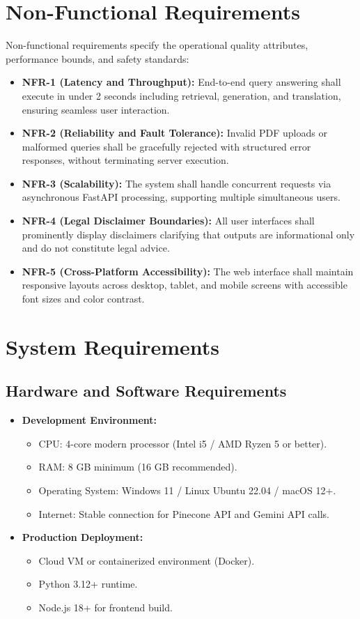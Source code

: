 \documentclass[12pt,a4paper]{report}
\begin{document}
\section{Non-Functional Requirements}
Non-functional requirements specify the operational quality attributes, performance bounds, and safety standards:
\begin{itemize}
    \item \textbf{NFR-1 (Latency and Throughput):} End-to-end query answering shall execute in under 2 seconds including retrieval, generation, and translation, ensuring seamless user interaction.
    \item \textbf{NFR-2 (Reliability and Fault Tolerance):} Invalid PDF uploads or malformed queries shall be gracefully rejected with structured error responses, without terminating server execution.
    \item \textbf{NFR-3 (Scalability):} The system shall handle concurrent requests via asynchronous FastAPI processing, supporting multiple simultaneous users.
    \item \textbf{NFR-4 (Legal Disclaimer Boundaries):} All user interfaces shall prominently display disclaimers clarifying that outputs are informational only and do not constitute legal advice.
    \item \textbf{NFR-5 (Cross-Platform Accessibility):} The web interface shall maintain responsive layouts across desktop, tablet, and mobile screens with accessible font sizes and color contrast.
\end{itemize}

\section{System Requirements}

\subsection{Hardware and Software Requirements}
\begin{itemize}
    \item \textbf{Development Environment:}
    \begin{itemize}
        \item CPU: 4-core modern processor (Intel i5 / AMD Ryzen 5 or better).
        \item RAM: 8 GB minimum (16 GB recommended).
        \item Operating System: Windows 11 / Linux Ubuntu 22.04 / macOS 12+.
        \item Internet: Stable connection for Pinecone API and Gemini API calls.
    \end{itemize}
    \item \textbf{Production Deployment:}
    \begin{itemize}
        \item Cloud VM or containerized environment (Docker).
        \item Python 3.12+ runtime.
        \item Node.js 18+ for frontend build.
    \end{itemize}
\end{itemize}
\end{document}
